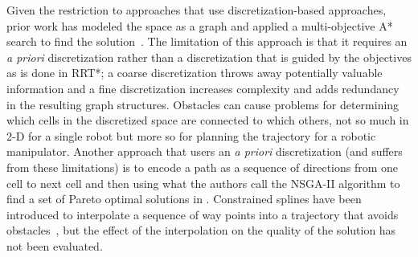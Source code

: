 \documentclass[conference]{IEEEtran}
\begin{document}
Given the restriction to approaches that use discretization-based approaches, prior work has modeled the space as a graph and applied a multi-objective A* search to find the solution~\cite{Mandow:2005:NAM:1642293.1642328}. 
The limitation of this approach is that it requires an {\em a priori} discretization rather than a discretization that is guided by the objectives as is done in RRT*; a coarse discretization throws away potentially valuable information and a fine discretization increases complexity and adds redundancy in the resulting graph structures.
Obstacles can cause problems for determining which cells in the discretized space are connected to which others, not so much in 2-D for a single robot but more so for planning the trajectory for a robotic manipulator.
Another approach that users an {\em a priori} discretization (and suffers from these limitations) is to encode a path as a sequence of directions from one cell to next cell and then using what the authors call the NSGA-II algorithm to find a set of Pareto optimal solutions in \cite{Ahmed2013}.  
Constrained splines have been introduced to interpolate a sequence of way points into a trajectory that avoids obstacles~\cite{6181426}, but the effect of the interpolation on the quality of the solution has not been evaluated.

\end{document}

